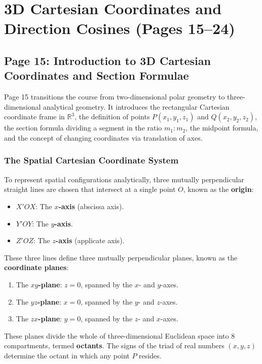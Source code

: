 \chapter{3D Cartesian Coordinates and Direction Cosines (Pages 15--24)}
\label{ch:coordinates_dc_dr}

\section{Page 15: Introduction to 3D Cartesian Coordinates and Section Formulae}
\label{sec:page15}

\begin{conceptbox}
Page 15 transitions the course from two-dimensional polar geometry to three-dimensional analytical geometry. It introduces the rectangular Cartesian coordinate frame in $\mathbb{R}^3$, the definition of points $P(x_1, y_1, z_1)$ and $Q(x_2, y_2, z_2)$, the section formula dividing a segment in the ratio $m_1 : m_2$, the midpoint formula, and the concept of changing coordinates via translation of axes.
\end{conceptbox}

\subsection{The Spatial Cartesian Coordinate System}
To represent spatial configurations analytically, three mutually perpendicular straight lines are chosen that intersect at a single point $O$, known as the \textbf{origin}:
\begin{itemize}[noitemsep]
    \item $X'OX$: The \textbf{$x$-axis} (abscissa axis).
    \item $Y'OY$: The \textbf{$y$-axis}.
    \item $Z'OZ$: The \textbf{$z$-axis} (applicate axis).
\end{itemize}
These three lines define three mutually perpendicular planes, known as the \textbf{coordinate planes}:
\begin{enumerate}[noitemsep]
    \item The \textbf{$xy$-plane}: $z = 0$, spanned by the $x$- and $y$-axes.
    \item The \textbf{$yz$-plane}: $x = 0$, spanned by the $y$- and $z$-axes.
    \item The \textbf{$zx$-plane}: $y = 0$, spanned by the $z$- and $x$-axes.
\end{enumerate}
These planes divide the whole of three-dimensional Euclidean space into $8$ compartments, termed \textbf{octants}. The signs of the triad of real numbers $(x, y, z)$ determine the octant in which any point $P$ resides.

